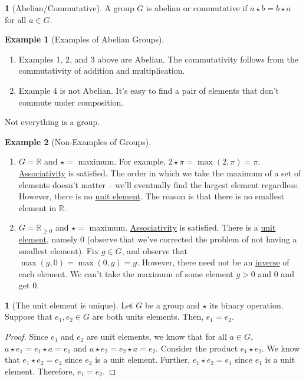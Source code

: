 \documentclass[12pt]{article}
\theoremstyle{definition}
\newtheorem{definition}{\color{NavyBlue}{\textbf{Definition}}}
\newtheorem{theorem}{\color{ForestGreen}{\textbf{Theorem}}}
\newtheorem{example}{\color{WildStrawberry}Example}
\theoremstyle{definition}
\begin{document}
\begin{definition}[Abelian/Commutative]
A group $G$ is abelian or commutative if $a \star b = b \star a$ for all $a \in G$.
\end{definition}

\begin{example}[Examples of Abelian Groups]
\begin{enumerate}
\item Examples 1, 2, and 3 above are Abelian. The commutativity follows from the commutativity of addition and multiplication.
\item Example 4 is not Abelian. It's easy to find a pair of elements that don't commute under composition.
\end{enumerate}
\end{example}

Not everything is a group.
\begin{example}[Non-Examples of Groups]
\begin{enumerate}
\item $G = \mathbb{R}$ and $\star =$ maximum. For example, $2 \star \pi = \max(2,\pi) = \pi$. \underline{Associativity} is satisfied. The order in which we take the maximum of a set of elements doesn't matter -- we'll eventually find the largest element regardless. However, there is no \underline{unit element}. The reason is that there is no smallest element in $\mathbb{R}$.  
\item $G = \mathbb{R}_{\geq 0}$ and $\star =$ maximum. \underline{Associativity} is satisfied. There is a \underline{unit element}, namely $0$ (observe that we've corrected the problem of not having a smallest element). Fix $g \in G$, and observe that $\max(g,0) = \max(0,g) = g$. However, there need not be an \underline{inverse} of each element. We can't take the maximum of some element $g > 0$ and $0$ and get $0$.
\end{enumerate}
\end{example}

\begin{theorem}[The unit element is unique]
Let $G$ be a group and $\star$ its binary operation. Suppose that $e_1, e_2 \in G$ are both units elements. Then, $e_1 = e_2$.
\end{theorem}
\begin{proof}
Since $e_1$ and $e_2$ are unit elements, we know that for all $a \in G$, $a \star e_1 = e_1 \star a = e_1$ and $a \star e_2 = e_2 \star a = e_2$. Consider the product $e_1 \star e_2$. We know that $e_1 \star e_2 = e_2$ since $e_2$ is a unit element. Further, $e_1 \star e_2 = e_1$ since $e_1$ is a unit element. Therefore, $e_1 = e_2$. 
\end{proof}
\end{document}
